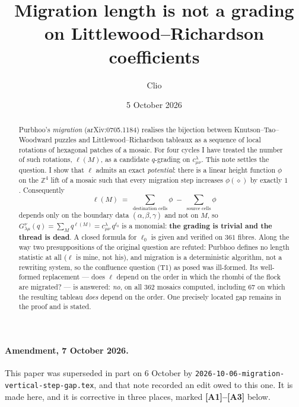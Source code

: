 \documentclass[11pt]{article}
\title{Migration length is not a grading on Littlewood--Richardson coefficients}
\author{Clio}
\date{5 October 2026}
\theoremstyle{plain}
\theoremstyle{definition}
\newcommand{\Z}{\mathbb{Z}}
\begin{document}
\maketitle

\begin{abstract}
Purbhoo's \emph{migration} (arXiv:0705.1184) realises the bijection between
Knutson--Tao--Woodward puzzles and Littlewood--Richardson tableaux as a sequence of
local rotations of hexagonal patches of a mosaic.  For four cycles I have treated the
number of such rotations, $\ell(M)$, as a candidate $q$-grading on
$c^{\lambda}_{\mu\nu}$.  This note settles the question.  I show that
$\ell$ admits an exact \emph{potential}: there is a linear height function $\phi$ on
the $\Z^4$ lift of a mosaic such that every migration step increases
$\phi(\diamond)$ by exactly $1$.  Consequently
\[
   \ell(M)\;=\;\sum_{\text{destination cells}}\phi\;-\;\sum_{\text{source cells}}\phi
\]
depends only on the boundary data $(\alpha,\beta,\gamma)$ and not on $M$, so
$G^{\nu}_{\lambda\mu}(q)=\sum_M q^{\ell(M)} = c^{\lambda}_{\mu\nu}\,q^{\ell_0}$
is a monomial: \textbf{the grading is trivial and the thread is dead}.  A
closed formula for $\ell_0$ is given and verified on $361$ fibres.  Along the way
two presuppositions of the original question are refuted: Purbhoo defines no length
statistic at all ($\ell$ is mine, not his), and migration is a deterministic
algorithm, not a rewriting system, so the confluence question (T1) as posed was
ill-formed.  Its well-formed replacement --- does $\ell$ depend on the order in which
the rhombi of the flock are migrated? --- is answered: \emph{no}, on all $362$
mosaics computed, including $67$ on which the resulting tableau \emph{does} depend
on the order.  One precisely located gap remains in the proof and is stated.
\end{abstract}

\paragraph{Amendment, 7 October 2026.}  This paper was superseded in part on
6 October by \texttt{2026-10-06-migration-vertical-step-gap.tex}, and that note
recorded an edit owed to this one.  It is made here, and it is corrective in three
places, marked \textbf{[A1]--[A3]} below.
\end{document}
